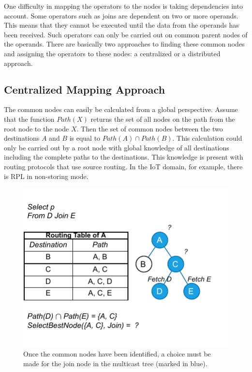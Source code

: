 \documentclass[english,version-2019-11]{uzl-thesis}
\begin{document}
One difficulty in mapping the operators to the nodes is taking dependencies into account. Some operators such as joins are dependent on two or more operands. This means that they cannot be executed until the data from the operands has been received. Such operators can only be carried out on common parent nodes of the operands. There are basically two approaches to finding these common nodes and assigning the operators to these nodes: a centralized or a distributed approach.

\subsection{Centralized Mapping Approach}
The common nodes can easily be calculated from a global perspective. Assume that the function $Path (X)$ returns the set of all nodes on the path from the root node to the node $X$. Then the set of common nodes between the two destinations $A$ and $B$ is equal to $Path(A) \cap Path(B)$. This calculation could only be carried out by a root node with global knowledge of all destinations including the complete paths to the destinations. This knowledge is present with routing protocols that use source routing. In the IoT domain, for example, there is RPL in non-storing mode.
\begin{figure}[htpb]
  \centering
  \includegraphics[scale=1.1]{figure_centralized_approach.pdf}
  \caption{Once the common nodes have been identified, a choice must be made for the join node in the multicast tree (marked in blue).}
  \label{figure_centralized_approach}
\end{figure}
\end{document}
